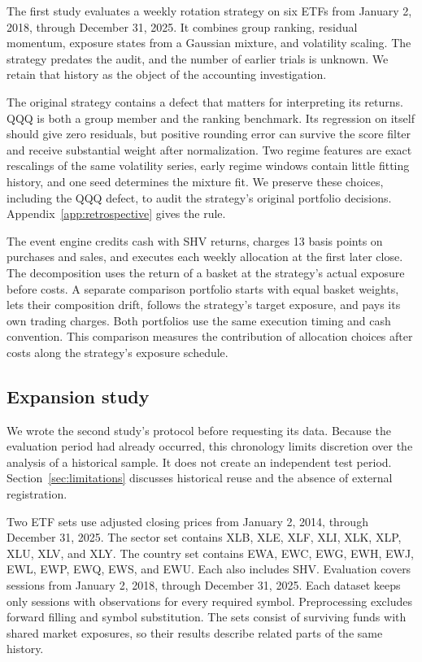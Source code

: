 \documentclass{article}
\begin{document}
The first study evaluates a weekly rotation strategy on six ETFs from
January 2, 2018, through December 31, 2025. It combines group ranking, residual momentum, exposure states from a Gaussian mixture, and volatility scaling. The strategy predates the audit, and the number of earlier trials is unknown. We retain that history as the object of the accounting investigation.

The original strategy contains a defect that matters for interpreting its returns. QQQ is both a group member and the ranking benchmark. Its regression on itself should give zero residuals, but positive rounding error can survive the score filter and receive substantial weight after normalization. Two regime features are exact rescalings of the same volatility series, early regime windows contain little fitting history, and one seed determines the mixture fit. We preserve these choices, including the QQQ defect, to audit the strategy's original portfolio decisions. Appendix~\ref{app:retrospective} gives the rule.

The event engine credits cash with SHV returns, charges 13 basis points on purchases and sales, and executes each weekly allocation at the first later close. The decomposition uses the return of a basket at the strategy's actual exposure before costs. A separate comparison portfolio starts with equal basket weights, lets their composition drift, follows the strategy's target exposure, and pays its own trading charges. Both portfolios use the same execution timing and cash convention. This comparison measures the contribution of allocation choices after costs along the strategy's exposure schedule.

\subsection{Expansion study}

We wrote the second study's protocol before requesting its data. Because the evaluation period had already occurred, this chronology limits discretion over the analysis of a historical sample. It does not create an independent test period. Section~\ref{sec:limitations} discusses historical reuse and the absence of external registration.

Two ETF sets use adjusted closing prices from January 2, 2014, through
December 31, 2025. The sector set contains XLB, XLE, XLF, XLI, XLK, XLP, XLU, XLV, and
XLY. The country set contains EWA, EWC, EWG, EWH, EWJ, EWL, EWP, EWQ, EWS, and
EWU. Each also includes SHV. Evaluation covers \ExpansionEvaluationSessions{}
sessions from January 2, 2018, through December 31, 2025. Each dataset keeps only sessions with observations for every required symbol. Preprocessing excludes forward filling and symbol substitution. The sets consist of surviving funds with shared market exposures, so their results describe related parts of the same history.
\end{document}
